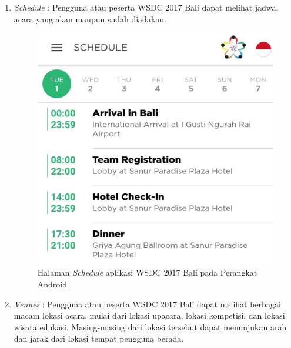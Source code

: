 \begin{enumerate}
	\item {\it Schedule} : Pengguna atau peserta WSDC 2017 Bali dapat melihat jadwal acara yang akan maupun sudah diadakan.

	\begin{figure}[H]
	    \centering
	    \includegraphics[scale=0.3]{Gambar/Schedule.jpg}
	    \caption{Halaman {\it Schedule} aplikasi WSDC 2017 Bali pada Perangkat Android}
	    \label{fig:wsdcappschedule}
	\end{figure}

	\item {\it Venues} : Pengguna atau peserta WSDC 2017 Bali dapat melihat berbagai macam lokasi acara, mulai dari lokasi upacara, lokasi kompetisi, dan lokasi wisata edukasi. Masing-masing dari lokasi tersebut dapat menunjukan arah dan jarak dari lokasi tempat pengguna berada.


\end{enumerate}
